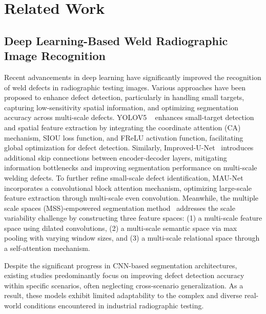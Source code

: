 \section{Related Work}
\label{sec2}


\subsection{Deep Learning-Based Weld Radiographic Image Recognition}  
\label{subsec2.1}
Recent advancements in deep learning have significantly improved the recognition of weld defects in radiographic testing images. Various approaches have been proposed to enhance defect detection, particularly in handling small targets, capturing low-sensitivity spatial information, and optimizing segmentation accuracy across multi-scale defects.
YOLOV5 ~\cite{xu2023defect} enhances small-target detection and spatial feature extraction by integrating the coordinate attention (CA) mechanism, SIOU loss function, and FReLU activation function, facilitating global optimization for defect detection. Similarly, Improved-U-Net~\cite{yang2021automatic} introduces additional skip connections between encoder-decoder layers, mitigating information bottlenecks and improving segmentation performance on multi-scale welding defects. 
To further refine small-scale defect identification, MAU-Net~\cite{wang2024new} incorporates a convolutional block attention mechanism, optimizing large-scale feature extraction through multi-scale even convolution. Meanwhile, the multiple scale spaces (MSS)-empowered segmentation method~\cite{liu2023multiple} addresses the scale variability challenge by constructing three feature spaces: (1) a multi-scale feature space using dilated convolutions, (2) a multi-scale semantic space via max pooling with varying window sizes, and (3) a multi-scale relational space through a self-attention mechanism. 

Despite the significant progress in CNN-based segmentation architectures, existing studies predominantly focus on improving defect detection accuracy within specific scenarios, often neglecting cross-scenario generalization. As a result, these models exhibit limited adaptability to the complex and diverse real-world conditions encountered in industrial radiographic testing.

